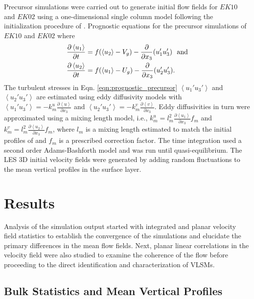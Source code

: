 \documentclass{svjour3}                     %
\begin{document}
Precursor simulations were carried out to generate initial flow fields for $EK10$ and $EK02$ using a one-dimensional single column model following the initialization procedure of \citet{andren_brown_qjrm_94}. Prognostic equations for the precursor simulations of $EK10$ and $EK02$ where
\begin{align}
\frac{\partial \left < u_{1} \right >}{\partial t}  &= f(\left < u_{2} \right > - V_g)-\frac{\partial }{\partial x_3}(u_{1}'u_{3}') \notag \ \ \text{and} \\  
\frac{\partial \left < u_{2} \right > }{\partial t} &=f(\left < u_{1} \right > - U_g)-\frac{\partial }{\partial x_3}(u_{2}'u_{3}').
\label{eqn:prognostic_precursor}
\end{align} 
The turbulent stresses in Eqn. \ref{eqn:prognostic_precursor} $\left < u_{1}'u_{3}' \right >$ and $\left < u_{2}'u_{3}' \right >$ are estimated using eddy diffusivity models with $\left < u_{1}'u_{3}' \right > = -k_{m}^{u}\frac{\partial \left < u \right >}{\partial x_3}$ and $\left < u_{2}'u_{3}' \right > =-k_m^{v}\frac{\partial \left < v \right >}{\partial x_3}$. Eddy diffusivities in turn were approximated using a mixing length model, i.e., $k_m^{u} = l_m^2\frac{\partial \left < u_{1} \right >}{\partial x_3}f_m$ and $k_m^{v} = l_m^2\frac{\partial \left < u_{2}\right >}{\partial x_3}f_m$, where $l_m$ is a mixing length estimated to match the initial profiles of \citet{andren_brown_qjrm_94} and $f_m$ is a prescribed correction factor. The time integration used a second order Adams-Bashforth model and was run until quasi-equilibrium. The LES 3D initial velocity fields were generated by adding random fluctuations to the mean vertical profiles in the surface layer. 

\section{Results}
Analysis of the simulation output started with integrated and planar velocity field statistics to establish the convergence of the simulations and elucidate the primary differences in the mean flow fields. Next, planar linear correlations in the velocity field were also studied to examine the coherence of the flow before proceeding to the direct identification and characterization of VLSMs. 
\subsection{Bulk Statistics and Mean Vertical Profiles}
\end{document}
